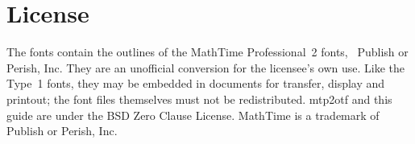 \documentclass[11pt,a4paper]{article}
\begin{document}
\section{License}
The fonts contain the outlines of the MathTime Professional~2 fonts,
\textcopyright\ Publish or Perish, Inc. They are an unofficial conversion
for the licensee's own use. Like the Type~1 fonts, they may be embedded in
documents for transfer, display and printout; the font files themselves
must not be redistributed. mtp2otf and this guide are under the BSD Zero
Clause License. MathTime is a trademark of Publish or Perish, Inc.
\end{document}
